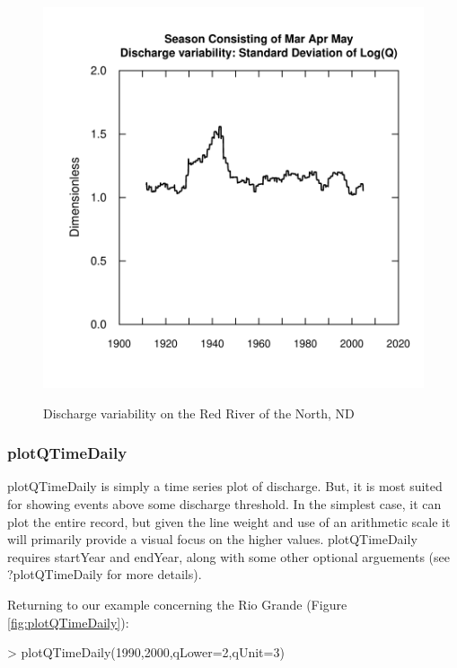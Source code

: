 \documentclass[a4paper,11pt]{article}
\begin{document}
\begin{figure}[htbp]
\begin{minipage}[h]{0.5\linewidth}
\begin{center}
\includegraphics{EGRET-fig3b}
    \label{fig:SDRed2}
    \end{center}
  \end{minipage}
  \caption{Discharge variability on the Red River of the North, ND}
  \label{fig:red}
\end{figure}

\FloatBarrier
\subsubsection{plotQTimeDaily}
\label{sec:plotQTimeDaily}
plotQTimeDaily is simply a time series plot of discharge.  But, it is most suited for showing events above some discharge threshold.  In the simplest case, it can plot the entire record, but given the line weight and use of an arithmetic scale it will primarily provide a visual focus on the higher values. plotQTimeDaily requires startYear and endYear, along with some other optional arguements (see ?plotQTimeDaily for more details).

Returning to our example concerning the Rio Grande (Figure \ref{fig:plotQTimeDaily}):
\begin{Schunk}
\begin{Sinput}
> plotQTimeDaily(1990,2000,qLower=2,qUnit=3)
\end{Sinput}
\end{Schunk}
\end{document}
